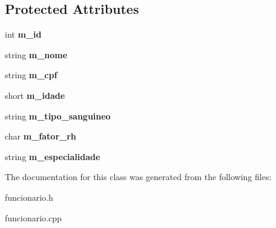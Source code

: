 \subsection*{Protected Attributes}
\begin{DoxyCompactItemize}
\item 
\mbox{\label{classFuncionario_a123c4af00e4e6eea5d4d9366a8bfefed}} 
int {\bfseries m\+\_\+id}
\item 
\mbox{\label{classFuncionario_a09663cf1395c066ef8cd538ead0f1a10}} 
string {\bfseries m\+\_\+nome}
\item 
\mbox{\label{classFuncionario_af367fc8ad2efde9527d1ed0455560690}} 
string {\bfseries m\+\_\+cpf}
\item 
\mbox{\label{classFuncionario_a2bc5a68aebcf1a792812430ce5c8bdca}} 
short {\bfseries m\+\_\+idade}
\item 
\mbox{\label{classFuncionario_a89037092e620b92e1e8e305de50cb2d9}} 
string {\bfseries m\+\_\+tipo\+\_\+sanguineo}
\item 
\mbox{\label{classFuncionario_ab8b1fa2c4d830ea6a03c5d1db8ee1002}} 
char {\bfseries m\+\_\+fator\+\_\+rh}
\item 
\mbox{\label{classFuncionario_a501682f1767cc891f9908ebc42e9e186}} 
string {\bfseries m\+\_\+especialidade}
\end{DoxyCompactItemize}


The documentation for this class was generated from the following files\+:\begin{DoxyCompactItemize}
\item 
funcionario.\+h\item 
funcionario.\+cpp\end{DoxyCompactItemize}
